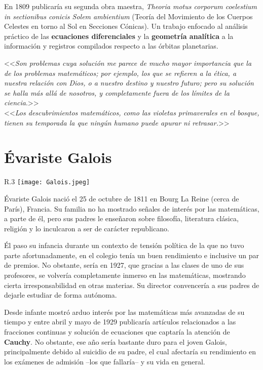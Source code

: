 \documentclass[11pt,oneside]{book}
\begin{document}
En 1809 publicaría su segunda obra maestra, \textit{Theoria motus corporum coelestium in sectionibus conicis Solem ambientium} (Teoría del Movimiento de los Cuerpos Celestes en torno al Sol en Secciones Cónicas). Un trabajo enfocado al análisis práctico de las \textbf{ecuaciones diferenciales} y la \textbf{geometría analítica} a la información y registros compilados respecto a las órbitas planetarias.

\begin{flushright}
<<\textit{Son problemas cuya solución me parece de mucho mayor importancia que la de los problemas matemáticos; por ejemplo, los que se refieren a la ética, a nuestra relación con Dios, o a nuestro destino y nuestro futuro; pero su solución se halla más allá de nosotros, y completamente fuera de los límites de la ciencia}.>>\\
<<\textit{Los descubrimientos matemáticos, como las violetas primaverales en el bosque, tienen su temporada la que ningún humano puede apurar ni retrasar.}>>
\end{flushright}

\section{Évariste Galois}
\begin{wrapfigure}{R}{.3\textwidth}
\texttt{[image: Galois.jpeg]}
\caption{}
\end{wrapfigure}
Évariste Galois nació el 25 de octubre de 1811 en Bourg La Reine (cerca de París), Francia. Su familia no ha mostrado señales de interés por las matemáticas, a parte de él, pero sus padres le enseñaron sobre filosofía, literatura clásica, religión y lo inculcaron a ser de carácter republicano.

Él paso su infancia durante un contexto de tensión política de la que no tuvo parte afortunadamente, en el colegio tenía un buen rendimiento e inclusive un par de premios. No obstante, sería en 1927, que gracias a las clases de uno de sus profesores, se volvería completamente inmerso en las matemáticas, mostrando cierta irresponsabilidad en otras materias. Su director convencería a sus padres de dejarle estudiar de forma autónoma.

Desde infante mostró arduo interés por las matemáticas más avanzadas de su tiempo y entre abril y mayo de 1929 publicaría artículos relacionados a las fracciones continuas y solución de ecuaciones que captaría la atención de \textbf{Cauchy}. No obstante, ese año sería bastante duro para el joven Galois, principalmente debido al suicidio de su padre, el cual afectaría su rendimiento en los exámenes de admisión --los que fallaría-- y su vida en general.
\end{document}
